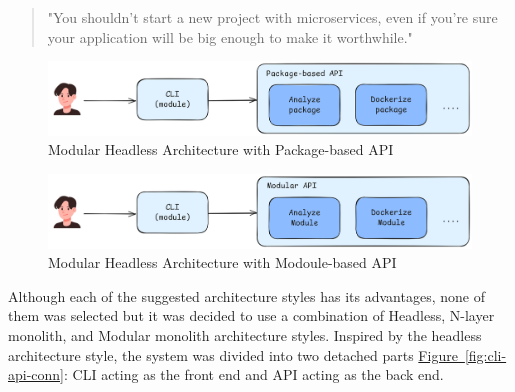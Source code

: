 \documentclass{article}
\newcommand{\FigRef}[1]{\hyperref[#1]{Figure~\ref{#1}}}
\begin{document}
\begin{multicols}{2}
\begin{quote}
    "You shouldn't start a new project with microservices, even if you're sure your application will be big enough to make it worthwhile."
\end{quote}

\begin{figure}[H]
    \centering
    \includegraphics[width=\linewidth]{images/modular-headless-architecture-level-1.png}
    \caption{Modular Headless Architecture with Package-based API}
    \label{fig:modular-headless-architecture-level-1}
\end{figure}

\begin{figure}[H]
    \centering
    \includegraphics[width=\linewidth]{images/modular-headless-architecture-level-2.png}
    \caption{Modular Headless Architecture with Modoule-based API}
    \label{fig:modular-headless-architecture-level-2}
\end{figure}

Although each of the suggested architecture styles has its advantages, none of them was selected but it was decided to use a combination of Headless, N-layer monolith, and Modular monolith architecture styles. Inspired by the headless architecture style, the system was divided into two detached parts \FigRef{fig:cli-api-conn}: CLI acting as the front end and API acting as the back end. 


\end{multicols}
\end{document}

